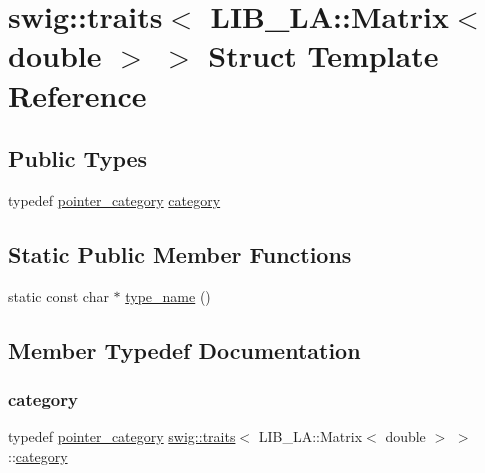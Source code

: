 \hypertarget{structswig_1_1traits_3_01_l_i_b___l_a_1_1_matrix_3_01double_01_4_01_4}{}\section{swig\+:\+:traits$<$ L\+I\+B\+\_\+\+LA\+:\+:Matrix$<$ double $>$ $>$ Struct Template Reference}
\label{structswig_1_1traits_3_01_l_i_b___l_a_1_1_matrix_3_01double_01_4_01_4}
\subsection*{Public Types}
\begin{DoxyCompactItemize}
\item 
typedef \hyperlink{structswig_1_1pointer__category}{pointer\+\_\+category} \hyperlink{structswig_1_1traits_3_01_l_i_b___l_a_1_1_matrix_3_01double_01_4_01_4_a595a2140f9b504444be25e11c6a73e83}{category}
\end{DoxyCompactItemize}
\subsection*{Static Public Member Functions}
\begin{DoxyCompactItemize}
\item 
static const char $\ast$ \hyperlink{structswig_1_1traits_3_01_l_i_b___l_a_1_1_matrix_3_01double_01_4_01_4_a07a2319d73c1dab5e16980e3e7776342}{type\+\_\+name} ()
\end{DoxyCompactItemize}


\subsection{Member Typedef Documentation}
\mbox{\label{structswig_1_1traits_3_01_l_i_b___l_a_1_1_matrix_3_01double_01_4_01_4_a595a2140f9b504444be25e11c6a73e83}} 
\subsubsection{\texorpdfstring{category}{category}}
{\footnotesize\ttfamily typedef \hyperlink{structswig_1_1pointer__category}{pointer\+\_\+category} \hyperlink{structswig_1_1traits}{swig\+::traits}$<$ L\+I\+B\+\_\+\+L\+A\+::\+Matrix$<$ double $>$ $>$\+::\hyperlink{structswig_1_1traits_3_01_l_i_b___l_a_1_1_matrix_3_01double_01_4_01_4_a595a2140f9b504444be25e11c6a73e83}{category}}



